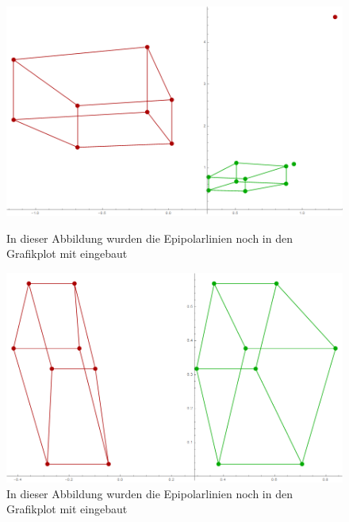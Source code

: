 \begin{figure}[!htb]
	\includegraphics[width=\linewidth]{images/Rectification_Resolution_Abbild_verhaeltnisse.png}
	\caption{In dieser Abbildung wurden die Epipolarlinien noch in den Grafikplot mit eingebaut}
	\endminipage\hfill
	\includegraphics[width=\linewidth]{images/Rectification_Resolution_verhaeltnisse.png}
	\caption{In dieser Abbildung wurden die Epipolarlinien noch in den Grafikplot mit eingebaut}
	\endminipage\hfill
\end{figure}


%



